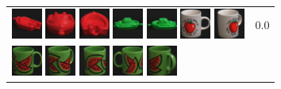 \begin{figure}[!bp]
\begin{tabular}{m{11cm} | m{3cm} |}
\includegraphics[width=1cm]{coil/beeld-22.eps}
\includegraphics[width=1cm]{coil/beeld-20.eps}
\includegraphics[width=1cm]{coil/beeld-23.eps}
\includegraphics[width=1cm]{coil/beeld-55.eps}
\includegraphics[width=1cm]{coil/beeld-54.eps}
\includegraphics[width=1cm]{coil/beeld-36.eps}
\includegraphics[width=1cm]{coil/beeld-39.eps}
& {\scriptsize 0.0}
\\
\includegraphics[width=1cm]{coil/beeld-30.eps}
\includegraphics[width=1cm]{coil/beeld-33.eps}
\includegraphics[width=1cm]{coil/beeld-32.eps}
\includegraphics[width=1cm]{coil/beeld-31.eps}
\includegraphics[width=1cm]{coil/beeld-34.eps}

\end{tabular}
\end{figure}
